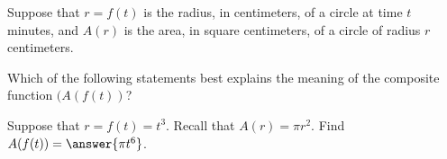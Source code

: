 \documentclass{ximera}
\author{Elizabeth Miller}
\begin{document}
\licenseAPC
\begin{exercise}

Suppose that $r=f(t)$ is the radius, in centimeters, of a circle at time $t$ minutes, and $A(r)$ is the area, in square centimeters, of a circle of radius $r$ centimeters.

Which of the following statements best explains the meaning of the composite function $(A(f(t))$?

\begin{multipleChoice}  
\end{multipleChoice}  

Suppose that $r=f(t)=t^3$.  Recall that $A(r)=\pi r^2$.  Find $A(f(t))=\answer{\pi t^6}$.

\end{exercise}
\end{document}
